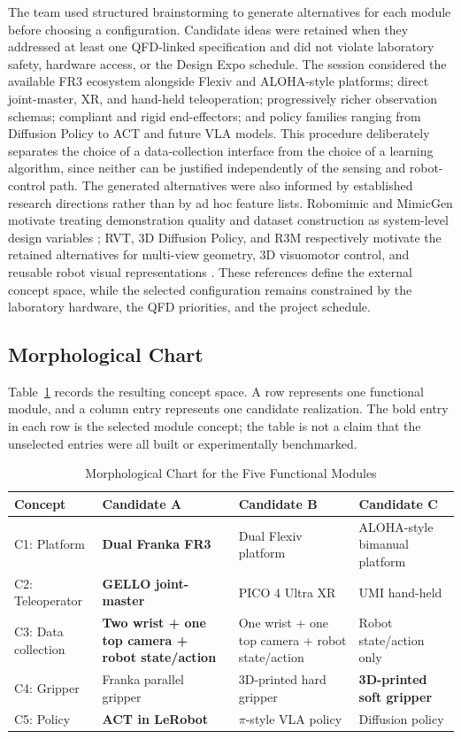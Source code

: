 \documentclass[12pt, letterpaper]{article}
\begin{document}
The team used structured brainstorming to generate alternatives for each module before choosing a configuration. Candidate ideas were retained when they addressed at least one QFD-linked specification and did not violate laboratory safety, hardware access, or the Design Expo schedule. The session considered the available FR3 ecosystem alongside Flexiv and ALOHA-style platforms; direct joint-master, XR, and hand-held teleoperation; progressively richer observation schemas; compliant and rigid end-effectors; and policy families ranging from Diffusion Policy to ACT and future VLA models. This procedure deliberately separates the choice of a data-collection interface from the choice of a learning algorithm, since neither can be justified independently of the sensing and robot-control path.
The generated alternatives were also informed by established research directions rather than by ad hoc feature lists. Robomimic and MimicGen motivate treating demonstration quality and dataset construction as system-level design variables \cite{robomimic,mimicgen}; RVT, 3D Diffusion Policy, and R3M respectively motivate the retained alternatives for multi-view geometry, 3D visuomotor control, and reusable robot visual representations \cite{rvt,dp3,r3m}. These references define the external concept space, while the selected configuration remains constrained by the laboratory hardware, the QFD priorities, and the project schedule.

\subsection{Morphological Chart}

Table~\ref{tab:morphological-chart} records the resulting concept space. A row represents one functional module, and a column entry represents one candidate realization. The bold entry in each row is the selected module concept; the table is not a claim that the unselected entries were all built or experimentally benchmarked.

\begin{table}[H]
\centering
\caption{Morphological Chart for the Five Functional Modules}
\label{tab:morphological-chart}
\small
\begin{tabularx}{\textwidth}{p{}XXX}
\toprule
\textbf{Concept} & \textbf{Candidate A} & \textbf{Candidate B} & \textbf{Candidate C} \\
\midrule
C1: Platform & \textbf{Dual Franka FR3} & Dual Flexiv platform & ALOHA-style bimanual platform \\
C2: Teleoperator & \textbf{GELLO joint-master} & PICO 4 Ultra XR & UMI hand-held \\
C3: Data collection & \textbf{Two wrist + one top camera + robot state/action} & One wrist + one top camera + robot state/action & Robot state/action only \\
C4: Gripper & Franka parallel gripper & 3D-printed hard gripper & \textbf{3D-printed soft gripper} \\
C5: Policy & \textbf{ACT in LeRobot} & $\pi$-style VLA policy & Diffusion policy \\
\bottomrule
\end{tabularx}
\end{table}
\end{document}
